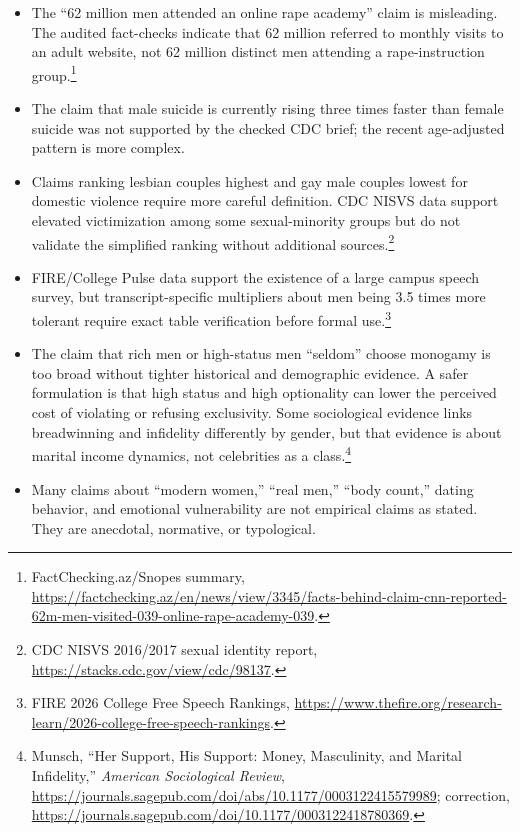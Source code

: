 \documentclass[12pt]{article}
\newcommand{\SourceNote}[1]{\footnote{#1}}
\begin{document}
\begin{itemize}
  \item The ``62 million men attended an online rape academy'' claim is misleading. The audited fact-checks indicate that 62 million referred to monthly visits to an adult website, not 62 million distinct men attending a rape-instruction group.\SourceNote{FactChecking.az/Snopes summary, \url{https://factchecking.az/en/news/view/3345/facts-behind-claim-cnn-reported-62m-men-visited-039-online-rape-academy-039}.}
  \item The claim that male suicide is currently rising three times faster than female suicide was not supported by the checked CDC brief; the recent age-adjusted pattern is more complex.
  \item Claims ranking lesbian couples highest and gay male couples lowest for domestic violence require more careful definition. CDC NISVS data support elevated victimization among some sexual-minority groups but do not validate the simplified ranking without additional sources.\SourceNote{CDC NISVS 2016/2017 sexual identity report, \url{https://stacks.cdc.gov/view/cdc/98137}.}
  \item FIRE/College Pulse data support the existence of a large campus speech survey, but transcript-specific multipliers about men being 3.5 times more tolerant require exact table verification before formal use.\SourceNote{FIRE 2026 College Free Speech Rankings, \url{https://www.thefire.org/research-learn/2026-college-free-speech-rankings}.}
  \item The claim that rich men or high-status men ``seldom'' choose monogamy is too broad without tighter historical and demographic evidence. A safer formulation is that high status and high optionality can lower the perceived cost of violating or refusing exclusivity. Some sociological evidence links breadwinning and infidelity differently by gender, but that evidence is about marital income dynamics, not celebrities as a class.\SourceNote{Munsch, ``Her Support, His Support: Money, Masculinity, and Marital Infidelity,'' \textit{American Sociological Review}, \url{https://journals.sagepub.com/doi/abs/10.1177/0003122415579989}; correction, \url{https://journals.sagepub.com/doi/10.1177/0003122418780369}.}
  \item Many claims about ``modern women,'' ``real men,'' ``body count,'' dating behavior, and emotional vulnerability are not empirical claims as stated. They are anecdotal, normative, or typological.
\end{itemize}
\end{document}
